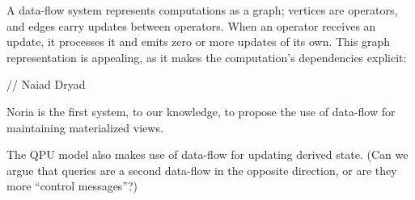 A data-flow system represents computations as a graph;
vertices are operators, and edges carry updates between operators.
When an operator receives an update, it processes it and emits zero or more updates of its own.
This graph representation is appealing, as it makes the computation’s dependencies explicit:

// Naiad \cite{murray:naiad} Dryad \cite{isard:dryad} 

Noria is the first system, to our knowledge, to propose the use of data-flow for maintaining materialized views.

The QPU model also makes use of data-flow for updating derived state.
(Can we argue that queries are a second data-flow in the opposite direction, or are they more ``control messages''?)




